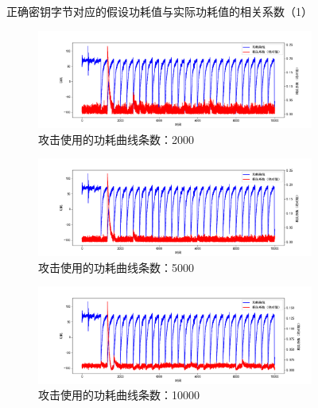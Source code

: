 \begin{figure}[htbp]
    \caption{正确密钥字节对应的假设功耗值与实际功耗值的相关系数（1）}
    \label{fig:leakage}
\end{figure}

\begin{figure}[htbp]
\ContinuedFloat
    \begin{subfigure}{1.0\textwidth}
        \includegraphics[height=.21\textheight, width=1.0\textwidth]{../images/leakage_2000.png}
        \caption{攻击使用的功耗曲线条数：2000}
    \end{subfigure}
    \begin{subfigure}{1.0\textwidth}
        \includegraphics[height=.21\textheight, width=1.0\textwidth]{../images/leakage_5000.png}
        \caption{攻击使用的功耗曲线条数：5000}
    \end{subfigure}
    \begin{subfigure}{1.0\textwidth}
        \includegraphics[height=.21\textheight, width=1.0\textwidth]{../images/leakage_10000.png}
        \caption{攻击使用的功耗曲线条数：10000}
    \end{subfigure}
    \begin{subfigure}{1.0\textwidth}

\end{subfigure}
\end{figure}
